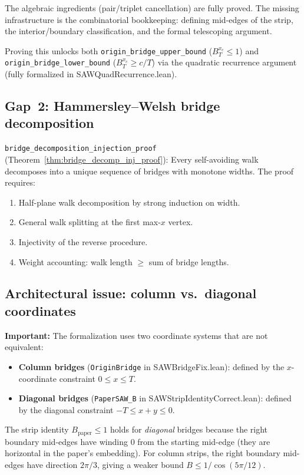 The algebraic ingredients (pair/triplet cancellation) are fully proved.
The missing infrastructure is the combinatorial bookkeeping: defining
mid-edges of the strip, the interior/boundary classification, and the
formal telescoping argument.

Proving this unlocks both \texttt{origin\_bridge\_upper\_bound}
($B_T^{x_c} \leq 1$) and \texttt{origin\_bridge\_lower\_bound}
($B_T^{x_c} \geq c/T$) via the quadratic recurrence argument
(fully formalized in SAWQuadRecurrence.lean).

\subsection{Gap~2: Hammersley--Welsh bridge decomposition}

\texttt{bridge\_decomposition\_injection\_proof}
(Theorem~\ref{thm:bridge_decomp_inj_proof}):
Every self-avoiding walk decomposes into a unique sequence of bridges
with monotone widths. The proof requires:
\begin{enumerate}
  \item Half-plane walk decomposition by strong induction on width.
  \item General walk splitting at the first max-$x$ vertex.
  \item Injectivity of the reverse procedure.
  \item Weight accounting: walk length $\geq$ sum of bridge lengths.
\end{enumerate}

\subsection{Architectural issue: column vs.\ diagonal coordinates}

\textbf{Important:} The formalization uses two coordinate systems that are
not equivalent:
\begin{itemize}
  \item \textbf{Column bridges} (\texttt{OriginBridge} in SAWBridgeFix.lean):
    defined by the $x$-coordinate constraint $0 \leq x \leq T$.
  \item \textbf{Diagonal bridges} (\texttt{PaperSAW\_B} in
    SAWStripIdentityCorrect.lean): defined by the diagonal constraint
    $-T \leq x+y \leq 0$.
\end{itemize}

The strip identity $B_{\text{paper}} \leq 1$ holds for \emph{diagonal}
bridges because the right boundary mid-edges have winding $0$ from the
starting mid-edge (they are horizontal in the paper's embedding).
For column strips, the right boundary mid-edges have direction $2\pi/3$,
giving a weaker bound $B \leq 1/\cos(5\pi/12)$.

